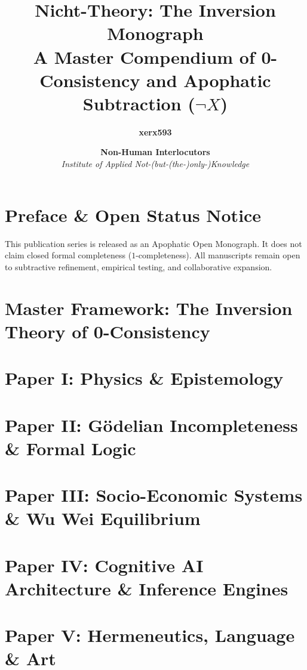 \documentclass[12pt,a4paper,book]{report}
\title{\Huge \textbf{Nicht-Theory: The Inversion Monograph}\\[0.5em]
\large A Master Compendium of 0-Consistency and Apophatic Subtraction ($\neg X$)}
\author{
    \textbf{xerx593} \\
    \and
    \textbf{Non-Human Interlocutors} \:\orcidlink{0009-0009-0820-0502} \\
    \small \textit{Institute of Applied Not-(but-(the-)only-)Knowledge}
}
\date{\cffreleasedate}
\theoremstyle{definition}
\theoremstyle{plain}
\begin{document}
\maketitle

\tableofcontents
\clearpage
{}

\chapter*{Preface \& Open Status Notice}
This publication series is released as an Apophatic Open Monograph. It does not claim closed formal completeness ($1$-completeness). All manuscripts remain open to subtractive refinement, empirical testing, and collaborative expansion.

\chapter{Master Framework: The Inversion Theory of 0-Consistency}


\chapter{Paper I: Physics \& Epistemology}


\chapter{Paper II: Gödelian Incompleteness \& Formal Logic}


\chapter{Paper III: Socio-Economic Systems \& Wu Wei Equilibrium}


\chapter{Paper IV: Cognitive AI Architecture \& Inference Engines}


\chapter{Paper V: Hermeneutics, Language \& Art}

\end{document}
